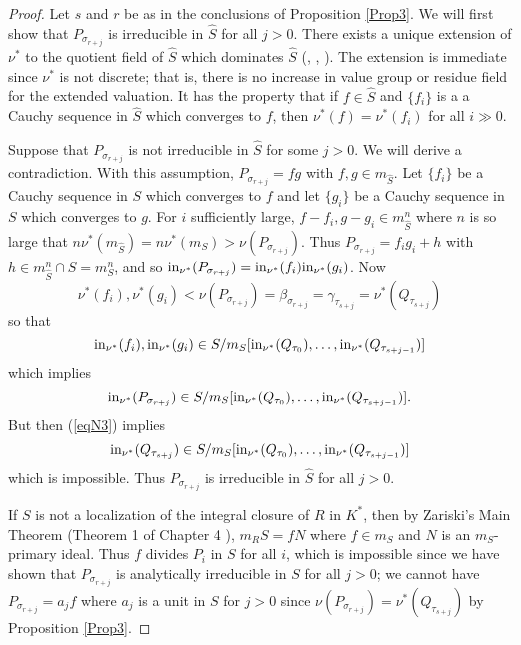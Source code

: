 \documentclass[11pt]{amsart}
\begin{document}
 
 \begin{proof} Let $s$ and $r$ be as in the conclusions of Proposition \ref{Prop3}. We will first show that $P_{\sigma_{r+j}}$ is irreducible in $\hat S$ for all $j>0$. There exists a unique extension of $\nu^*$ to the quotient field of $\hat S$ which dominates $\hat S$ (\cite{Sp}, \cite{CV1}, \cite{GAST}).  The extension is immediate since $\nu^*$ is not discrete; that is, there is no increase in value group or residue field for the extended valuation. It has the property that if $f\in \hat S$ and $\{f_i\}$ is a a Cauchy sequence in $\hat S$ which converges to $f$, then $\nu^*(f)=\nu^*(f_i)$ for all $i\gg 0$. 
 
 Suppose that $P_{\sigma_{r+j}}$ is not irreducible in $\hat S$ for some $j>0$. We will derive a contradiction. With this assumption,  $P_{\sigma_{r+j}}=fg$ with $f,g\in m_{\hat S}$. Let $\{f_i\}$ be a Cauchy sequence in $S$ which converges to $f$ and let $\{g_i\}$ be a Cauchy sequence in $S$ which converges to $g$. For $i$ sufficiently large, $f-f_i,g-g_i\in m_{\hat S}^n$ where $n$ is so large that $n\nu^*(m_{\hat S})=n\nu^*(m_S)>\nu(P_{\sigma_{r+j}})$.
 Thus $P_{\sigma_{r+j}}=f_ig_i+h$ with $h\in m_{\hat S}^n\cap S=m_S^n$, and so ${\rm in}_{\nu^*}(P_{\sigma_{r+j}})={\rm in}_{\nu^*}(f_i){\rm in}_{\nu^*}(g_i)$. Now
 $$
 \nu^*(f_i),\nu^*(g_i)<\nu(P_{\sigma_{r+j}})=\beta_{\sigma_{r+j}}=\gamma_{\tau_{s+j}}=\nu^*(Q_{\tau_{s+j}})
 $$
 so that 
 $$
 {\rm in}_{\nu^*}(f_i),{\rm in}_{\nu^*}(g_i)\in S/m_S[{\rm in }_{\nu^*}(Q_{\tau_0}),\ldots, {\rm in}_{\nu^*}(Q_{\tau_{s+j-1}})]
 $$
 which  implies 
 $$
 {\rm in}_{\nu^*}(P_{\sigma_{r+j}})\in S/m_S[{\rm in }_{\nu^*}(Q_{\tau_0}),\ldots, {\rm in}_{\nu^*}(Q_{\tau_{s+j-1}})].
 $$ 
 But then (\ref{eqN3}) implies 
 $$
 {\rm in}_{\nu^*}(Q_{\tau_{s+j}})\in S/m_S[{\rm in }_{\nu^*}(Q_{\tau_0}),\ldots, {\rm in}_{\nu^*}(Q_{\tau_{s+j-1}})]
 $$  
 which is impossible. Thus $P_{\sigma_{r+j}}$ is irreducible in $\hat S$ for all $j>0$.
 
 If $S$ is not a localization of the integral closure of $R$ in $K^*$, then by Zariski's Main Theorem (Theorem 1 of Chapter 4 \cite{R}), $m_RS=fN$ where $f\in m_S$ and $N$ is an $m_S$-primary ideal. Thus $f$ divides $P_i$ in $S$ for all $i$, which is impossible since we have shown that $P_{\sigma_{r+j}}$ is analytically irreducible in $S$ for all $j>0$; we cannot have $P_{\sigma_{r+j}}=a_jf$ where $a_j$ is a unit in $S$ for $j>0$  since 
 $\nu(P_{\sigma_{r+j}})=\nu^*(Q_{\tau_{s+j}})$ by Proposition \ref{Prop3}.
 
 
 

\end{proof}
\end{document}

